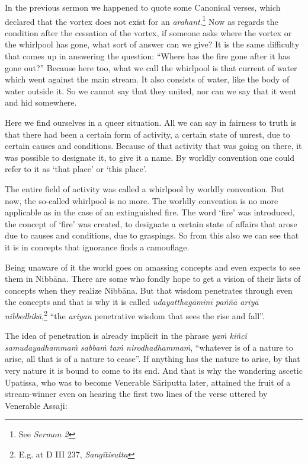 In the previous sermon we happened to quote some Canonical verses, which declared that the vortex does not exist for an \emph{arahant}.\footnote{See \emph{Sermon 2}} Now as regards the condition after the cessation of the vortex, if someone asks where the vortex or the whirlpool has gone, what sort of answer can we give? It is the same difficulty that comes up in answering the question: ``Where has the fire gone after it has gone out?'' Because here too, what we call the whirlpool is that current of water which went against the main stream. It also consists of water, like the body of water outside it. So we cannot say that they united, nor can we say that it went and hid somewhere.

Here we find ourselves in a queer situation. All we can say in fairness to truth is that there had been a certain form of activity, a certain state of unrest, due to certain causes and conditions. Because of that activity that was going on there, it was possible to designate it, to give it a name. By worldly convention one could refer to it as `that place' or `this place'.

The entire field of activity was called a whirlpool by worldly convention. But now, the so-called whirlpool is no more. The worldly convention is no more applicable as in the case of an extinguished fire. The word `fire' was introduced, the concept of `fire' was created, to designate a certain state of affairs that arose due to causes and conditions, due to graspings. So from this also we can see that it is in concepts that ignorance finds a camouflage.

Being unaware of it the world goes on amassing concepts and even expects to see them in Nibbāna. There are some who fondly hope to get a vision of their lists of concepts when they realize Nibbāna. But that wisdom penetrates through even the concepts and that is why it is called \emph{udayatthagāminī paññā ariyā nibbedhikā},\footnote{E.g. at D III 237, \emph{Sangītisutta}} ``the \emph{ariyan} penetrative wisdom that sees the rise and fall''.

The idea of penetration is already implicit in the phrase \emph{yaṁ kiñci samudayadhammaṁ sabbaṁ taṁ nirodhadhammaṁ}, ``whatever is of a nature to arise, all that is of a nature to cease''. If anything has the nature to arise, by that very nature it is bound to come to its end. And that is why the wandering ascetic Upatissa, who was to become Venerable Sāriputta later, attained the fruit of a stream-winner even on hearing the first two lines of the verse uttered by Venerable Assaji:

